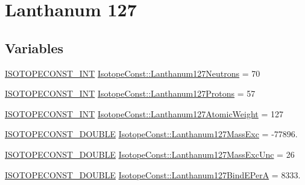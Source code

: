 \hypertarget{group___isotope_const-_lanthanum-_la127}{}\section{Lanthanum 127}
\label{group___isotope_const-_lanthanum-_la127}
\subsection*{Variables}
\begin{DoxyCompactItemize}
\item 
\mbox{\hyperlink{group___isotope_const-_macros_ga5f18360b3e99483a35c32d789e62621c}{I\+S\+O\+T\+O\+P\+E\+C\+O\+N\+S\+T\+\_\+\+I\+NT}} \mbox{\hyperlink{group___isotope_const-_lanthanum-_la127_ga44a5503269f64af07f2a4e01e34c88c8}{Isotope\+Const\+::\+Lanthanum127\+Neutrons}} = 70
\item 
\mbox{\hyperlink{group___isotope_const-_macros_ga5f18360b3e99483a35c32d789e62621c}{I\+S\+O\+T\+O\+P\+E\+C\+O\+N\+S\+T\+\_\+\+I\+NT}} \mbox{\hyperlink{group___isotope_const-_lanthanum-_la127_ga465c687f4695a0cca436ae3557781f71}{Isotope\+Const\+::\+Lanthanum127\+Protons}} = 57
\item 
\mbox{\hyperlink{group___isotope_const-_macros_ga5f18360b3e99483a35c32d789e62621c}{I\+S\+O\+T\+O\+P\+E\+C\+O\+N\+S\+T\+\_\+\+I\+NT}} \mbox{\hyperlink{group___isotope_const-_lanthanum-_la127_ga62db72c2bf9cc9e4b039368a4be8bbab}{Isotope\+Const\+::\+Lanthanum127\+Atomic\+Weight}} = 127
\item 
\mbox{\hyperlink{group___isotope_const-_macros_ga8f45a7272ce02c0b4c65c44636ed719a}{I\+S\+O\+T\+O\+P\+E\+C\+O\+N\+S\+T\+\_\+\+D\+O\+U\+B\+LE}} \mbox{\hyperlink{group___isotope_const-_lanthanum-_la127_gadb763e45b472274ce8b5872be1826cbd}{Isotope\+Const\+::\+Lanthanum127\+Mass\+Exc}} = -\/77896.
\item 
\mbox{\hyperlink{group___isotope_const-_macros_ga8f45a7272ce02c0b4c65c44636ed719a}{I\+S\+O\+T\+O\+P\+E\+C\+O\+N\+S\+T\+\_\+\+D\+O\+U\+B\+LE}} \mbox{\hyperlink{group___isotope_const-_lanthanum-_la127_ga1da889e5b5727460608e12e83fa8519b}{Isotope\+Const\+::\+Lanthanum127\+Mass\+Exc\+Unc}} = 26
\item 
\mbox{\hyperlink{group___isotope_const-_macros_ga8f45a7272ce02c0b4c65c44636ed719a}{I\+S\+O\+T\+O\+P\+E\+C\+O\+N\+S\+T\+\_\+\+D\+O\+U\+B\+LE}} \mbox{\hyperlink{group___isotope_const-_lanthanum-_la127_gaa418f5b18fcdf62307879571ddeff398}{Isotope\+Const\+::\+Lanthanum127\+Bind\+E\+PerA}} = 8333.
\item 

\end{DoxyCompactItemize}
